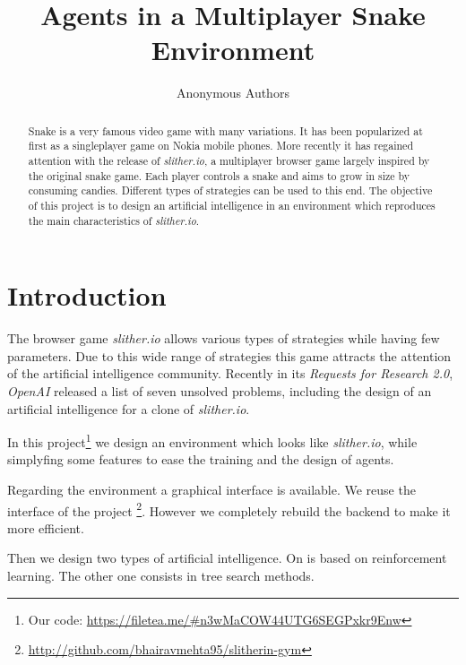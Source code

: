 \documentclass[journal, a4paper]{IEEEtran}
\begin{document}
\title{Agents in a Multiplayer Snake Environment}
\author{Anonymous Authors}
\maketitle

\begin{abstract}
Snake is a very famous video game with many variations. It has been popularized at first as a singleplayer game on Nokia mobile phones. More recently it has regained attention with the release of \emph{slither.io}, a multiplayer browser game largely inspired by the original snake game. Each player controls a snake and aims to grow in size by consuming candies. Different types of strategies can be used to this end. The objective of this project is to design an artificial intelligence in an environment which reproduces the main characteristics of \emph{slither.io}.

\end{abstract}

\section{Introduction}
The browser game \emph{slither.io} allows various types of strategies while having few parameters. Due to this wide range of strategies this game attracts the attention of the artificial intelligence community. Recently in its \emph{Requests for Research 2.0}, \emph{OpenAI} released a list of seven unsolved problems, including the design of an artificial intelligence for a clone of \emph{slither.io}.

In this project\footnote{Our code: \url{https://filetea.me/\#n3wMaCOW44UTG6SEGPxkr9Enw}}
we design an environment which looks like \emph{slither.io}, while simplyfing some features to ease the training and the design of agents. 

Regarding the environment a graphical interface is available. We reuse the interface of the project 
\footnote{\url{http://github.com/bhairavmehta95/slitherin-gym}}. However we completely rebuild the backend to make it more efficient. 

Then we design two types of artificial intelligence. On is based on reinforcement learning. The other one consists in tree search methods.
\end{document}
